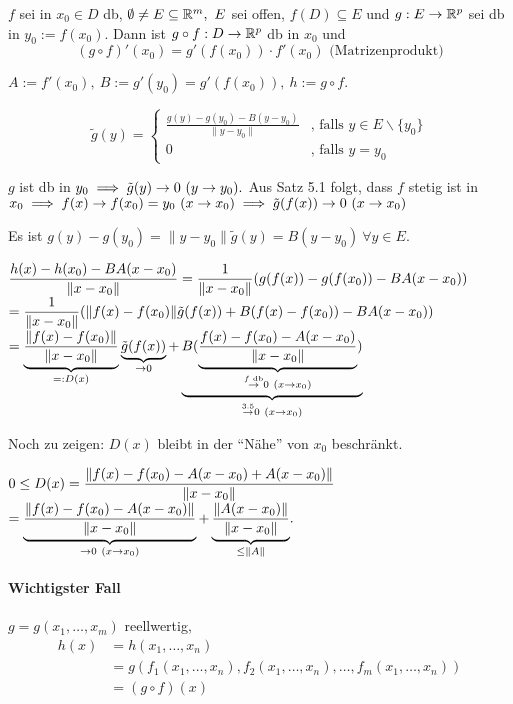 \documentclass[a4paper,oneside,DIV15,BCOR12mm,chapterprefix=true,headings=onelinechapter]{scrbook}
\begin{document}
\begin{satz}[Kettenregel]
$f$ sei in $x_0 \in D$ db, $\emptyset \ne E \subseteq \MdR^m,\ E$ sei offen, $f(D) \subseteq E$ und $g:E \to \mathbb{R}^p$ sei db in $y_0 := f(x_0)$. Dann ist $g \circ f: D \to \mathbb{R}^p$ db in $x_0$ und $$(g \circ f)'(x_0) = g'(f(x_0))\cdot f'(x_0)\text{ (Matrizenprodukt)}$$
\end{satz}

\begin{beweis}
$A := f'(x_0),\ B := g'(y_0) = g'(f(x_0)),\ h := g \circ f.$

$$\tilde{g}(y) = \begin{cases}
\frac{g(y)-g(y_0)-B(y-y_0)}{\|y-y_0\|} & \text{, falls } y \in E\backslash\{y_0\} \\
0                                      & \text{, falls } y = y_0
\end{cases}$$

$g$ ist db in $y_0 \implies \tilde{g}(y) \to 0\ (y \to y_0).$ Aus Satz 5.1 folgt, dass $f$ stetig ist in $x_0 \implies f(x) \to f(x_0) = y_0\ (x \to x_0) \implies \tilde{g}(f(x)) \to 0\ (x \to x_0)$

Es ist $g(y) - g(y_0) = \|y-y_0\| \tilde{g}(y) = B(y-y_0)\ \forall y \in E.$

$\displaystyle{\frac{h(x)-h(x_0)-BA(x-x_0)}{\|x-x_0\|} = \frac{1}{\|x-x_0\|}(g(f(x))-g(f(x_0))-BA(x-x_0))}$\\
$\displaystyle{= \frac{1}{\|x-x_0\|} (\|f(x)-f(x_0)\| \tilde{g}(f(x)) + B(f(x)-f(x_0))-BA(x-x_0))}$\\
$\displaystyle{= \underbrace{\frac{\|f(x)-f(x_0)\|}{\|x-x_0\|}}_{=:D(x)} \underbrace{\tilde{g}(f(x))}_{\to 0} + \underbrace{B(\underbrace{\frac{f(x)-f(x_0)-A(x-x_0)}{\|x-x_0\|}}_{\overset{f\text{ db}}{\to} 0\ (x \to x_0)})}_{\overset{\text{3.5}}{\to} 0\ (x \to x_0)}}$

Noch zu zeigen: $D(x)$ bleibt in der "`Nähe"' von $x_0$ beschränkt.

$0 \le D(x) = \displaystyle{\frac{\|f(x)-f(x_0)-A(x-x_0)+A(x-x_0)\|}{\|x-x_0\|}}$\\
$\displaystyle{= \underbrace{\frac{\|f(x)-f(x_0)-A(x-x_0)\|}{\|x-x_0\|}}_{\to 0\ (x \to x_0)} + \underbrace{\frac{\|A(x-x_0)\|}{\|x-x_0\|}}_{\le \|A\|}}.$
\end{beweis}

\paragraph{Wichtigster Fall} 
$g = g(x_1,\ldots,x_m)$ reellwertig, 
\begin{align*}
h(x) &= h(x_1,\ldots,x_n) \\
&= g(f_1(x_1,\ldots,x_n),f_2(x_1,\ldots,x_n),\ldots,f_m(x_1,\ldots,x_n)) \\
&= (g \circ f)(x)
\end{align*}
\end{document}
